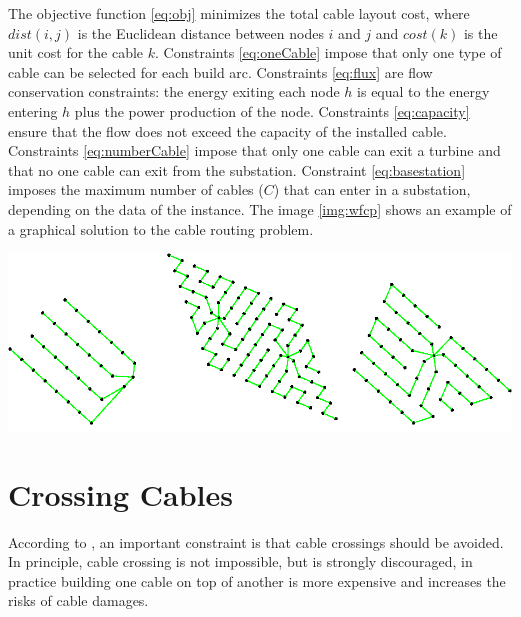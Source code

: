 The objective function \ref{eq:obj} minimizes the total cable layout cost, where $dist(i, j)$ is the Euclidean distance between nodes $i$ and $j$ and $cost(k)$ is the unit cost for the cable $k$. 
Constraints \ref{eq:oneCable} impose that only one type of cable can be selected for each build arc.
Constraints \ref{eq:flux} are flow conservation constraints: the energy exiting each node $h$ is equal to the energy entering $h$ plus the power production of the node. 
Constraints \ref{eq:capacity} ensure that the flow does not exceed the capacity of the installed cable.
Constraints \ref{eq:numberCable} impose that only one cable can exit a turbine and that no one cable can exit from the substation. 
Constraint \ref{eq:basestation} imposes the maximum number of cables ($C$) that can enter in a substation, depending on the data of the instance. The image \ref{img:wfcp} shows an example of a graphical solution to the cable routing problem.

\begin{center}
	\includegraphics[scale=0.4]{Graphics/wfcp.png}
	\label{img:wfcp}
\end{center}
	
\section{Crossing Cables}
According to \cite{wfcp}, an important constraint is that cable crossings should be avoided. In principle, cable crossing is not impossible, but is strongly discouraged, in practice building one cable on top of another is more expensive and increases the risks of cable damages.\\


